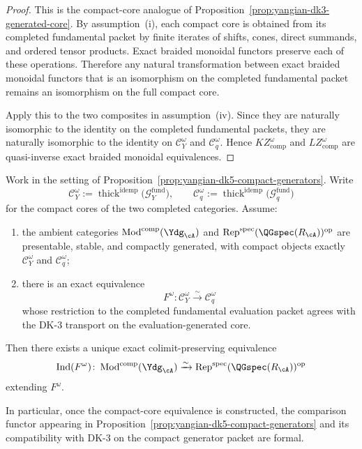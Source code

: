 \begin{proof}
This is the compact-core analogue of
Proposition~\ref{prop:yangian-dk3-generated-core}.  By
assumption~\textup{(i)}, each compact core is obtained from its
completed fundamental packet by finite iterates of shifts, cones,
direct summands, and ordered tensor products.  Exact braided monoidal
functors preserve each of these operations.  Therefore any natural
transformation between exact braided monoidal functors that is an
isomorphism on the completed fundamental packet remains an isomorphism
on the full compact core.

Apply this to the two composites in assumption~\textup{(iv)}.  Since
they are naturally isomorphic to the identity on the completed
fundamental packets, they are naturally isomorphic to the identity on
$\mathcal{C}_Y^\omega$ and $\mathcal{C}_q^\omega$.  Hence
$KZ^\omega_{\mathrm{comp}}$ and $LZ^\omega_{\mathrm{comp}}$ are
quasi-inverse exact braided monoidal equivalences.
\end{proof}

\begin{proposition}
\label{prop:yangian-dk5-ind-extension}
Work in the setting of
Proposition~\ref{prop:yangian-dk5-compact-generators}.  Write
\[
\mathcal{C}_Y^\omega
:=
\operatorname{thick}^{\mathrm{idemp}}
\bigl(\mathcal{G}^{\mathrm{fund}}_{Y}\bigr),
\qquad
\mathcal{C}_q^\omega
:=
\operatorname{thick}^{\mathrm{idemp}}
\bigl(\mathcal{G}^{\mathrm{fund}}_{q}\bigr)
\]
for the compact cores of the two completed categories.  Assume:
\begin{enumerate}[label=\textup{(\roman*)}]
\item the ambient categories
  $\operatorname{Mod}^{\mathrm{comp}}(\Ydg_{\cA})$ and
  $\operatorname{Rep}^{\mathrm{spec}}(\QGspec(R_{\cA}))^{\mathrm{op}}$
  are presentable, stable, and compactly generated, with compact
  objects exactly $\mathcal{C}_Y^\omega$ and $\mathcal{C}_q^\omega$;
\item there is an exact equivalence
  \[
  F^\omega\colon \mathcal{C}_Y^\omega \xrightarrow{\sim} \mathcal{C}_q^\omega
  \]
  whose restriction to the completed fundamental evaluation packet
  agrees with the DK-3 transport on the evaluation-generated core.
\end{enumerate}
Then there exists a unique exact colimit-preserving equivalence
\[
\operatorname{Ind}(F^\omega)\colon
\operatorname{Mod}^{\mathrm{comp}}(\Ydg_{\cA})
\xrightarrow{\sim}
\operatorname{Rep}^{\mathrm{spec}}(\QGspec(R_{\cA}))^{\mathrm{op}}
\]
extending $F^\omega$.

In particular, once the compact-core equivalence is constructed, the
comparison functor appearing in
Proposition~\ref{prop:yangian-dk5-compact-generators} and its
compatibility with DK-3 on the compact generator packet are formal.
\end{proposition}

